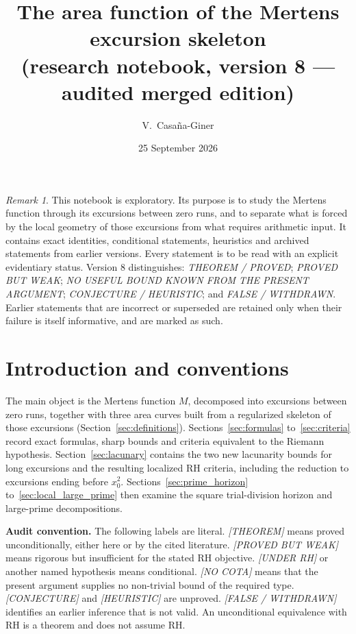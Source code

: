 \documentclass[11pt]{amsart}
\title[The area function of the Mertens excursion skeleton]{The area function of the Mertens excursion skeleton\\
(research notebook, version 8 --- audited merged edition)}
\author{V.~Casa\~na-Giner}
\date{25 September 2026}
\numberwithin{equation}{section}
\theoremstyle{plain}
\theoremstyle{definition}
\theoremstyle{remark}
\newtheorem{remark}[theorem]{Remark}
\begin{document}
\maketitle

\tableofcontents

\bigskip

\begin{remark}
\label{rem:exploratory_nature}
This notebook is exploratory. Its purpose is to study the Mertens function
through its excursions between zero runs, and to separate what is
forced by the local geometry of those excursions from what requires
arithmetic input. It contains exact identities, conditional statements,
heuristics and archived statements from earlier versions. Every statement
is to be read with an explicit evidentiary status. Version 8 distinguishes:
\emph{THEOREM / PROVED}; \emph{PROVED BUT WEAK}; \emph{NO USEFUL BOUND
KNOWN FROM THE PRESENT ARGUMENT}; \emph{CONJECTURE / HEURISTIC}; and
\emph{FALSE / WITHDRAWN}. Earlier statements that are incorrect or superseded
are retained only when their failure is itself informative, and are marked as
such.
\end{remark}

\section{Introduction and conventions}
\label{sec:introduction}

The main object is the Mertens function $M$, decomposed into excursions
between zero runs, together with three area curves built from a
regularized skeleton of those excursions
(Section~\ref{sec:definitions}). Sections~\ref{sec:formulas}
to~\ref{sec:criteria} record exact formulas, sharp bounds and criteria
equivalent to the Riemann hypothesis. Section~\ref{sec:lacunary} contains
the two new lacunarity bounds for long excursions and the resulting localized
RH criteria, including the reduction to excursions ending before $x_0^2$.
Sections~\ref{sec:prime_horizon} to~\ref{sec:local_large_prime} then examine
the square trial-division horizon and large-prime decompositions.

\medskip
\noindent\textbf{Audit convention.} The following labels are literal.
\emph{[THEOREM]} means proved unconditionally, either here or by the cited
literature. \emph{[PROVED BUT WEAK]} means rigorous but insufficient for the
stated RH objective. \emph{[UNDER RH]} or another named hypothesis means
conditional. \emph{[NO COTA]} means that the present argument supplies no
non-trivial bound of the required type. \emph{[CONJECTURE]} and
\emph{[HEURISTIC]} are unproved. \emph{[FALSE / WITHDRAWN]} identifies an
earlier inference that is not valid. An unconditional equivalence with RH is
a theorem and does not assume RH.
\end{document}
